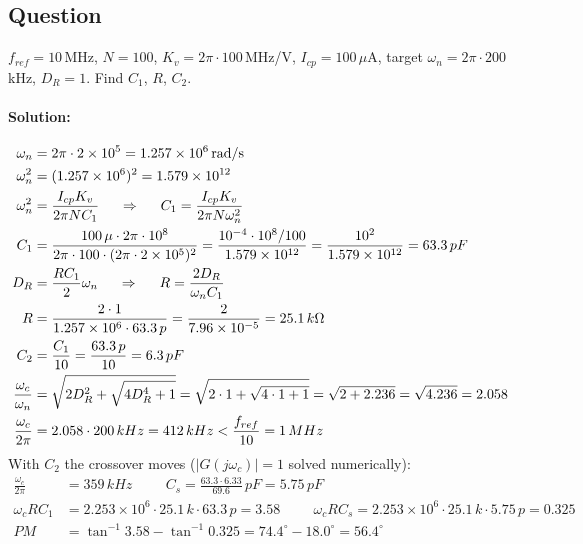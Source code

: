 \subsection{Question}
\(f_{ref} = 10\,\)MHz, \(N = 100\), \(K_v = 2\pi \cdot 100\,\)MHz/V,
\(I_{cp} = 100\,\mu\)A, target \(\omega_n = 2\pi \cdot 200\,\)kHz, \(D_R = 1\). Find
\(C_1\), \(R\), \(C_2\).
\paragraph{Solution:}
\begin{align*}
  \omega_n &= 2\pi \cdot 2 \times 10^5 = 1.257 \times 10^6\,\text{rad/s} \\
  \omega_n^2 &= (1.257 \times 10^6)^2 = 1.579 \times 10^{12} \\
  \omega_n^2 &= \frac{I_{cp} K_v}{2\pi N C_1} \hspace{0.5cm} \Rightarrow \hspace{0.5cm} C_1 = \frac{I_{cp} K_v}{2\pi N \omega_n^2} \\
  C_1 &= \frac{100\,\mu \cdot 2\pi \cdot 10^8}{2\pi \cdot 100 \cdot (2\pi \cdot 2 \times 10^5)^2} = \frac{10^{-4} \cdot 10^8 / 100}{1.579 \times 10^{12}} = \frac{10^{2}}{1.579 \times 10^{12}} = 63.3\,pF \\
  D_R &= \frac{RC_1}{2}\omega_n \hspace{0.5cm} \Rightarrow \hspace{0.5cm} R = \frac{2 D_R}{\omega_n C_1} \\
  R &= \frac{2 \cdot 1}{1.257 \times 10^6 \cdot 63.3\,p} = \frac{2}{7.96 \times 10^{-5}} = 25.1\,k\Omega \\
  C_2 &= \frac{C_1}{10} = \frac{63.3\,p}{10} = 6.3\,pF \\
  \frac{\omega_c}{\omega_n} &= \sqrt{2 D_R^2 + \sqrt{4 D_R^4 + 1}} = \sqrt{2 \cdot 1 + \sqrt{4 \cdot 1 + 1}} = \sqrt{2 + 2.236} = \sqrt{4.236} = 2.058 \\
  \frac{\omega_c}{2\pi} &= 2.058 \cdot 200\,kHz = 412\,kHz < \frac{f_{ref}}{10} = 1\,MHz
\end{align*}
With \(C_2\) the crossover moves (\(|G(j\omega_c)| = 1\) solved numerically):
\begin{align*}
  \frac{\omega_c}{2\pi} &= 359\,kHz \hspace{1cm} C_s = \frac{63.3 \cdot 6.33}{69.6}\,pF = 5.75\,pF \\
  \omega_c RC_1 &= 2.253 \times 10^6 \cdot 25.1\,k \cdot 63.3\,p = 3.58 \hspace{1cm} \omega_c RC_s = 2.253 \times 10^6 \cdot 25.1\,k \cdot 5.75\,p = 0.325 \\
  PM &= \tan^{-1}3.58 - \tan^{-1}0.325 = 74.4^\circ - 18.0^\circ = 56.4^\circ
\end{align*}

